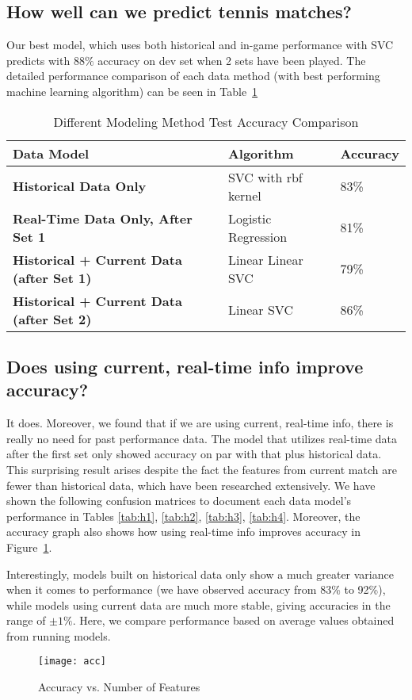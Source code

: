 \documentclass[paper=a4, fontsize=10pt]{scrartcl} %
\numberwithin{equation}{section} %
\numberwithin{figure}{section} %
\numberwithin{table}{section} %
\begin{document}
\subsection{How well can we predict tennis matches?}
Our best model, which uses both historical and in-game performance with SVC predicts with $88\%$ accuracy on dev set when 2 sets have been played. The detailed performance comparison of each data method (with best performing machine learning algorithm) can be seen in Table~\ref{tab:m1}
\begin{table}[h]
\caption{Different Modeling Method Test Accuracy Comparison}
\label{tab:m1}
\begin{tabular}{ p{2.5cm} | p{2.5cm} | p{2cm}}
    \hline
    \textbf{Data Model} & \textbf{Algorithm} & \textbf{Accuracy}  \\ \hline
   \textbf{Historical Data Only} &  SVC with rbf kernel & 83\%  \\ \hline
   \textbf{Real-Time Data Only, After Set 1} & Logistic Regression & 81\%  \\ \hline
   \textbf{Historical + Current Data (after Set 1)} &  Linear Linear SVC & 79\%  \\ \hline
   \textbf{Historical + Current Data (after Set 2)} &  Linear SVC & 86\% \\ \hline
\end{tabular}
\end{table}
\subsection{Does using current, real-time info improve accuracy?}
It does. Moreover, we found that if we are using current, real-time info, there is really no need for past performance data. The model that utilizes real-time data after the first
set only showed accuracy on par with that plus historical data. This surprising result arises despite the fact the features from current match are fewer than historical data, which have been researched extensively. We have shown the following confusion matrices to document each data model's performance in Tables \ref{tab:h1}, \ref{tab:h2}, \ref{tab:h3}, \ref{tab:h4}. Moreover, the accuracy graph also shows how using real-time info improves accuracy in Figure~\ref{fig:acc}.

Interestingly, models built on historical data only show a much greater variance when it comes to performance (we have observed accuracy from 83\% to 92\%), while models using current data are much more stable, giving accuracies in the range of $\pm1\%$. Here, we compare performance based on average values obtained from running models. 
\begin{figure}
\caption{Accuracy vs. Number of Features}
  \label{fig:acc}
  \centering
    \texttt{[image: acc]}
\end{figure}
\end{document}
